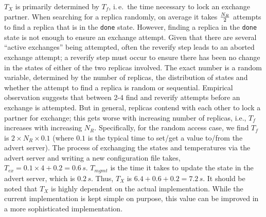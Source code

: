 \documentclass{rspublic}
\newcommand{\alnote}[1]{ {\textcolor{blue} { ***andre: #1 }}}
\newcommand{\athotanote}[1]{ {\textcolor{green} { ***athota: #1 }}}
\newcommand{\alnote}[1]{}
\newcommand{\athotanote}[1]{}
\begin{document}




$T_{X}$ is primarily determined by $T_f$, i.\,e.\ the time necessary
to lock an exchange partner.  When searching for a replica randomly,
on average it takes $N_R \over 2$ attempts to find a replica that is
in the \texttt{done} state.  However, finding a replica in the
\texttt{done} state is not enough to ensure an exchange attempt.
Given that there are several ``active exchanges'' being attempted,
often the reverify step leads to an aborted exchange attempt; a
reverify step must occur to ensure there has been no change in the
states of either of the two replicas involved.  The exact number is a
random variable, determined by the number of replicas, the
distribution of states and whether the attempt to find a replica is
random or sequential. Empirical observation suggests that between 2-4
find and reverify attempts before an exchange is attempted.  But in
general, replicas contend with each other to lock a partner for
exchange; this gets worse with increasing number of replicas, i.e.,
$T_f$ increases with increasing $N_R$.  Specifically, for the random
access case, we find $T_f$ is $2 \times N_R \times 0.1$ (where $0.1$
is the typical time to set/get a value to/from the advert server).
The process of exchanging the
states and temperatures via the advert server and writing a new
configuration file takes, $T_{ex} = 0.1\times 4 +0.2 = 0.6\,s$. %
$T_{mgmt}$ is the time it takes to update the state in the advert
server, which is $0.2\,s$.  Thus, $T_{X}$ is $6.4+0.6 +0.2=
7.2\,s$.  It should be noted that $T_{X}$ is highly dependent on
the actual implementation. While the current implementation is kept
simple on purpose, this value can be improved in a more sophisticated 
implementation.
\end{document}
